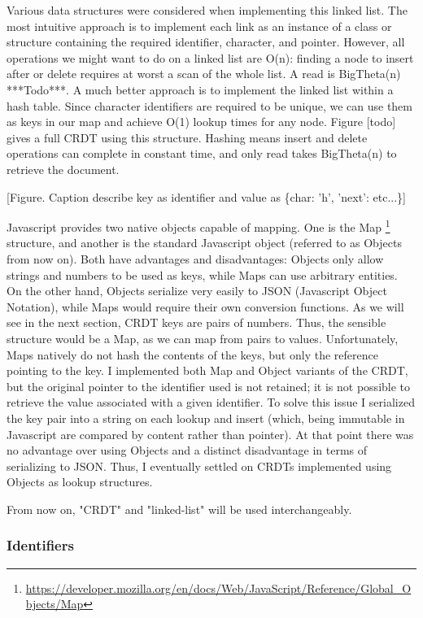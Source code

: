 \documentclass[12pt,a4paper,twoside,openright]{report}
\begin{document}
		Various data structures were considered when implementing this linked list. The most intuitive approach is to implement each link as an instance of a class or structure containing the required identifier, character, and pointer. However, all operations we might want to do on a linked list are O(n): finding a node to insert after or delete requires at worst a scan of the whole list. A read is BigTheta(n) ***Todo***. A much better approach is to implement the linked list within a hash table. Since character identifiers are required to be unique, we can use them as keys in our map and achieve O(1) lookup times for any node. Figure [todo] gives a full CRDT using this structure. Hashing means insert and delete operations can complete in constant time, and only read takes BigTheta(n) to retrieve the document.
		
		[Figure. Caption describe key as identifier and value as \{char: 'h', 'next': etc...\}]
		
		Javascript provides two native objects capable of mapping. One is the Map \footnote{\url{https://developer.mozilla.org/en/docs/Web/JavaScript/Reference/Global_Objects/Map}} structure, and another is the standard Javascript object (referred to as Objects from now on). Both have advantages and disadvantages: Objects only allow strings and numbers to be used as keys, while Maps can use arbitrary entities. On the other hand, Objects serialize very easily to JSON (Javascript Object Notation), while Maps would require their own conversion functions. As we will see in the next section, CRDT keys are pairs of numbers. Thus, the sensible structure would be a Map, as we can map from pairs to values. Unfortunately, Maps natively do not hash the contents of the keys, but only the reference pointing to the key. I implemented both Map and Object variants of the CRDT, but the original pointer to the identifier used is not retained; it is not possible to retrieve the value associated with a given identifier. To solve this issue I serialized the key pair into a string on each lookup and insert (which, being immutable in Javascript are compared by content rather than pointer). At that point there was no advantage over using Objects and a distinct disadvantage in terms of serializing to JSON. Thus, I eventually settled on CRDTs implemented using Objects as lookup structures.
		
		From now on, "CRDT" and "linked-list" will be used interchangeably.
	
		\subsubsection{Identifiers}
		
\end{document}
